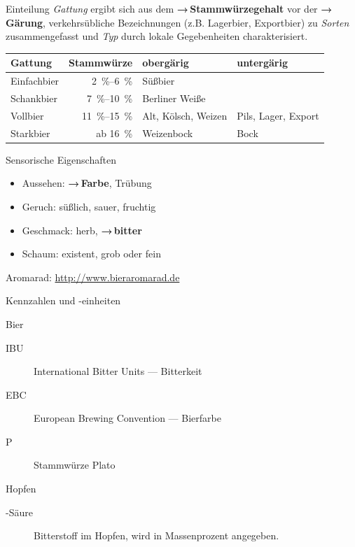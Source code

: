 \documentclass[9pt, ngerman]{beamer}
\newcommand{\forward}[1]{\textbf{→\,#1}}
\begin{document}
\begin{frame}{Einteilung}
  \emph{Gattung} ergibt sich aus dem \forward{Stammwürzegehalt} vor der
  \forward{Gärung}, verkehrsübliche Bezeichnungen (z.B. Lagerbier, Exportbier)
  zu \emph{Sorten} zusammengefasst und \emph{Typ} durch lokale Gegebenheiten
  charakterisiert.

  \begin{table}
    \begin{tabular}{lrll}
      \textbf{Gattung} & \textbf{Stammwürze} & \textbf{obergärig} & \textbf{untergärig}\\
      \midrule
      Einfachbier & \SIrange{2}{6}{\percent}    & Süßbier & \\
      Schankbier  & \SIrange{7}{10}{\percent}    & Berliner Weiße & \\
      Vollbier    & \SIrange{11}{15}{\percent}  & Alt, Kölsch, Weizen & Pils, Lager, Export \\
      Starkbier   & ab \SI{16}{\percent}         & Weizenbock & Bock \\
    \end{tabular}
  \end{table}
\end{frame}
\begin{frame}{Sensorische Eigenschaften}
  \begin{itemize}
    \item Aussehen: \forward{Farbe}, Trübung
    \item Geruch: süßlich, sauer, fruchtig
    \item Geschmack: herb, \forward{bitter}
    \item Schaum: existent, grob oder fein
  \end{itemize}
  Aromarad: \url{http://www.bieraromarad.de}
\end{frame}
\begin{frame}{Kennzahlen und -einheiten}
  \begin{block}{Bier}
    \begin{description}
      \item[IBU] International Bitter Units --- Bitterkeit
      \item[EBC] European Brewing Convention --- Bierfarbe
      \item[\textdegree P] Stammwürze \textdegree Plato
    \end{description}
  \end{block}

  \begin{block}{Hopfen}
    \begin{description}
      \item[\textalpha-Säure]  Bitterstoff im Hopfen, wird in Massenprozent angegeben.
    \end{description}
  \end{block}
\end{frame}
\end{document}
